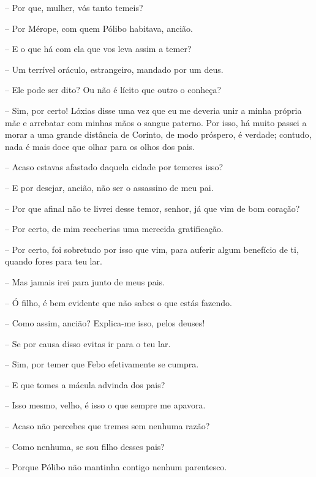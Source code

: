 --   Por que, mulher, vós tanto temeis?

 --    Por Mérope, com quem Pólibo habitava, ancião.

 --   E o que há com ela que vos leva assim a temer?

 --   Um terrível oráculo, estrangeiro, mandado por um deus.

 --   Ele pode ser dito? Ou não é lícito que outro o conheça?

 --   Sim, por certo! Lóxias disse uma vez que eu me deveria unir a minha
própria mãe e arrebatar com minhas mãos o sangue paterno. Por isso, há
muito passei a morar a uma grande distância de Corinto, de modo
próspero, é verdade; contudo, nada é mais doce que olhar para os olhos
dos pais.

 --    Acaso estavas afastado daquela cidade por temeres isso?

 --   E por desejar, ancião, não ser o assassino de meu pai.

 --   Por que afinal não te livrei desse temor, senhor, já que vim de bom
coração?

 --   Por certo, de mim receberias uma merecida gratificação.

 --   Por certo, foi sobretudo por isso que vim, para auferir algum benefício
de ti, quando fores para teu lar.

 --   Mas jamais irei para junto de meus pais.

 --   Ó filho, é bem evidente que não sabes o que estás fazendo.

 --   Como assim, ancião? Explica-me isso, pelos deuses!

 --    Se por causa disso evitas ir para o teu lar.

 --   Sim, por temer que Febo efetivamente se cumpra.

 --   E que tomes a mácula advinda dos pais?

 --   Isso mesmo, velho, é isso o que sempre me apavora.

 --   Acaso não percebes que tremes sem nenhuma razão?

 --   Como nenhuma, se sou filho desses pais?

 --   Porque Pólibo não mantinha contigo nenhum parentesco.

